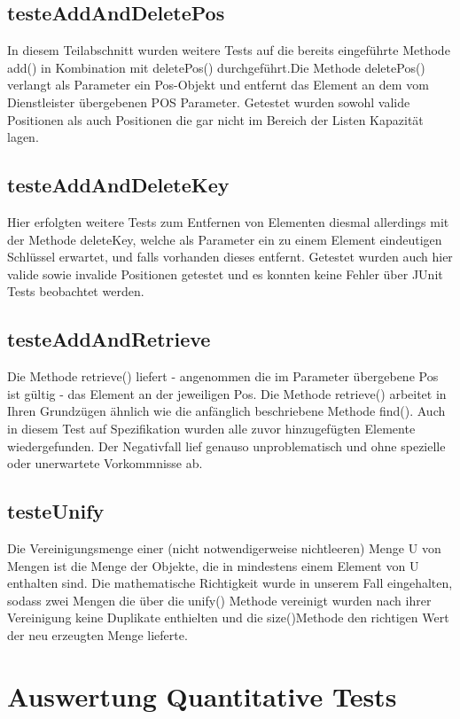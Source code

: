 \documentclass[paper=a4, fontsize=11pt]{scrartcl} %
\numberwithin{equation}{section} %
\numberwithin{figure}{section} %
\numberwithin{table}{section} %
\begin{document}
\subsection{testeAddAndDeletePos}
In diesem Teilabschnitt wurden weitere Tests auf die bereits eingeführte Methode add() in Kombination mit deletePos() durchgeführt.Die Methode deletePos() verlangt als
Parameter ein Pos-Objekt und entfernt das Element an dem vom Dienstleister übergebenen POS Parameter. Getestet wurden sowohl valide Positionen als auch Positionen die gar
nicht im Bereich der Listen Kapazität lagen. 

\subsection{testeAddAndDeleteKey}
Hier erfolgten weitere Tests zum Entfernen von Elementen diesmal allerdings mit der Methode deleteKey, welche als Parameter ein zu einem Element eindeutigen Schlüssel erwartet,
und falls vorhanden dieses entfernt. Getestet wurden auch hier valide sowie invalide Positionen getestet und es konnten keine Fehler über JUnit Tests beobachtet werden. 

\subsection{testeAddAndRetrieve}
Die Methode retrieve() liefert - angenommen die im Parameter übergebene Pos ist gültig - das Element an der jeweiligen Pos. Die Methode retrieve() arbeitet in Ihren Grundzügen 
ähnlich wie die anfänglich beschriebene Methode find(). Auch in diesem Test auf Spezifikation wurden alle zuvor hinzugefügten Elemente wiedergefunden. Der Negativfall lief genauso unproblematisch und 
ohne spezielle oder unerwartete Vorkommnisse ab. 

\subsection{testeUnify}
Die Vereinigungsmenge einer (nicht notwendigerweise nichtleeren) Menge U von Mengen ist die Menge der Objekte, die in mindestens einem Element von U enthalten sind.
Die mathematische Richtigkeit wurde in unserem Fall eingehalten, sodass zwei Mengen die über die unify() Methode vereinigt wurden nach ihrer Vereinigung keine Duplikate enthielten und die size()Methode 
den richtigen Wert der neu erzeugten Menge lieferte.
\newpage
\twocolumn
\section{Auswertung Quantitative Tests}
\end{document}
